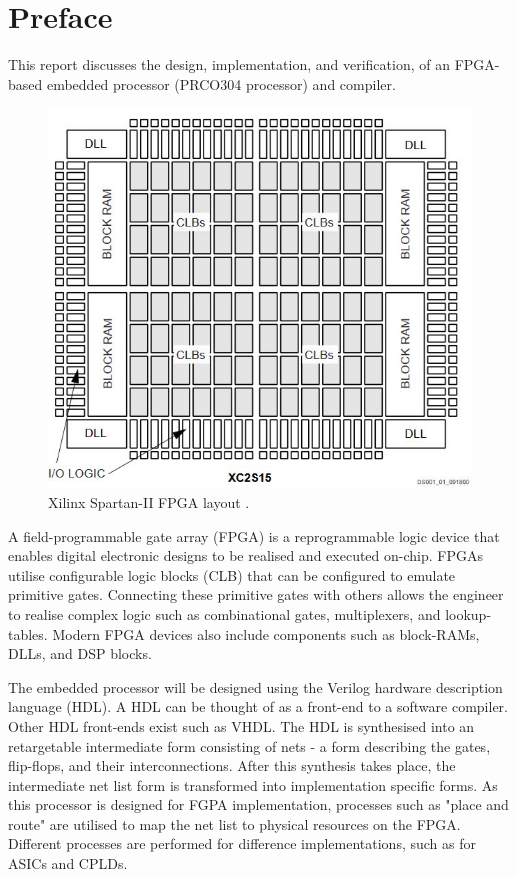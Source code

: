 \documentclass[11pt,a4paper]{report}
\newcommand{\scname}{PRCO304}
\begin{document}
\newpage
\chapter*{Preface}
\label{sect:preface}
This report discusses the design, implementation, and verification, of an FPGA-based embedded processor (\scname{} processor) and compiler.

\begin{figure}[H]
\begin{center}
\includegraphics[scale=0.4]{fpga}
\end{center}
\caption{Xilinx Spartan-II FPGA layout \cite{spartan2}.}
\label{fig:}
\end{figure}

A field-programmable gate array (FPGA) is a reprogrammable logic device that enables digital electronic designs to be realised and executed on-chip. FPGAs utilise configurable logic blocks (CLB) that can be configured to emulate primitive gates. Connecting these primitive gates with others allows the engineer to realise complex logic such as combinational gates, multiplexers, and lookup-tables. Modern FPGA devices also include components such as block-RAMs, DLLs, and DSP blocks.

The embedded processor will be designed using the Verilog hardware description language (HDL). A HDL can be thought of as a front-end to a software compiler. Other HDL front-ends exist such as VHDL. The HDL is synthesised into an retargetable intermediate form consisting of nets - a form describing the gates, flip-flops, and their interconnections. After this synthesis takes place, the intermediate net list form is transformed into implementation specific forms. As this processor is designed for FGPA implementation, processes such as "place and route" are utilised to map the net list to physical resources on the FPGA. Different processes are performed for difference implementations, such as for ASICs and CPLDs.
\end{document}
